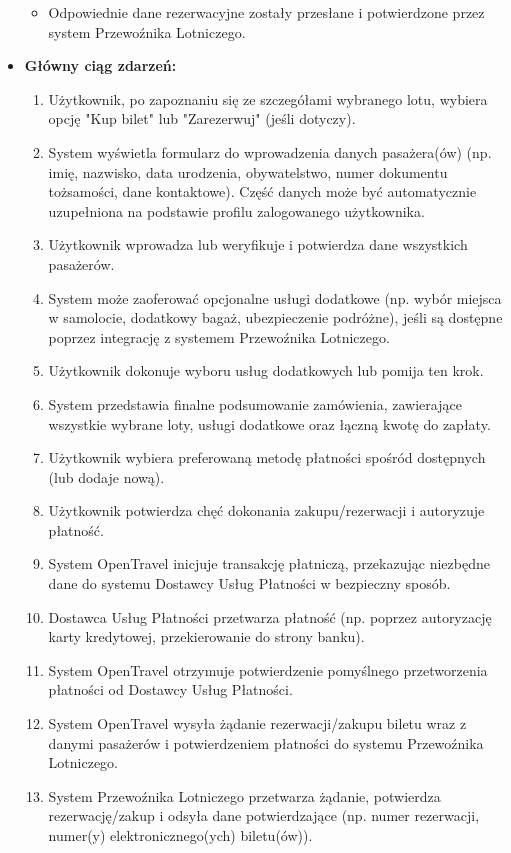 \documentclass[a4paper,12pt]{article}
\begin{document}
\begin{itemize}
\begin{itemize}
            \item Odpowiednie dane rezerwacyjne zostały przesłane i potwierdzone przez system Przewoźnika Lotniczego.
        \end{itemize}
    \item \textbf{Główny ciąg zdarzeń:}
        \begin{enumerate}
            \item Użytkownik, po zapoznaniu się ze szczegółami wybranego lotu, wybiera opcję "Kup bilet" lub "Zarezerwuj" (jeśli dotyczy).
            \item System wyświetla formularz do wprowadzenia danych pasażera(ów) (np. imię, nazwisko, data urodzenia, obywatelstwo, numer dokumentu tożsamości, dane kontaktowe). Część danych może być automatycznie uzupełniona na podstawie profilu zalogowanego użytkownika.
            \item Użytkownik wprowadza lub weryfikuje i potwierdza dane wszystkich pasażerów.
            \item System może zaoferować opcjonalne usługi dodatkowe (np. wybór miejsca w samolocie, dodatkowy bagaż, ubezpieczenie podróżne), jeśli są dostępne poprzez integrację z systemem Przewoźnika Lotniczego.
            \item Użytkownik dokonuje wyboru usług dodatkowych lub pomija ten krok.
            \item System przedstawia finalne podsumowanie zamówienia, zawierające wszystkie wybrane loty, usługi dodatkowe oraz łączną kwotę do zapłaty.
            \item Użytkownik wybiera preferowaną metodę płatności spośród dostępnych (lub dodaje nową).
            \item Użytkownik potwierdza chęć dokonania zakupu/rezerwacji i autoryzuje płatność.
            \item System OpenTravel inicjuje transakcję płatniczą, przekazując niezbędne dane do systemu Dostawcy Usług Płatności w bezpieczny sposób.
            \item Dostawca Usług Płatności przetwarza płatność (np. poprzez autoryzację karty kredytowej, przekierowanie do strony banku).
            \item System OpenTravel otrzymuje potwierdzenie pomyślnego przetworzenia płatności od Dostawcy Usług Płatności.
            \item System OpenTravel wysyła żądanie rezerwacji/zakupu biletu wraz z danymi pasażerów i potwierdzeniem płatności do systemu Przewoźnika Lotniczego.
            \item System Przewoźnika Lotniczego przetwarza żądanie, potwierdza rezerwację/zakup i odsyła dane potwierdzające (np. numer rezerwacji, numer(y) elektronicznego(ych) biletu(ów)).

\end{enumerate}
\end{itemize}
\end{document}
